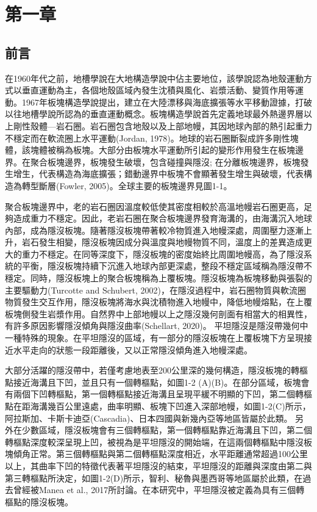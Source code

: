 
\chapter{第一章}

\section{前言}

在1960年代之前，地槽學說在大地構造學說中佔主要地位，該學說認為地殼運動方式以垂直運動為主，各個地殼區域內發生沈積與風化、岩漿活動、變質作用等運動。1967年板塊構造學說提出，建立在大陸漂移與海底擴張等水平移動證據，打破以往地槽學說所認為的垂直運動概念。板塊構造學說首先定義地球最外熱邊界層以上剛性殼體---岩石圈。岩石圈包含地殼以及上部地幔，其因地球內部的熱引起重力不穩定而在軟流圈上水平運動(Jordan, 1978)。地球的岩石圈斷裂成許多剛性塊體，該塊體被稱為板塊。大部分由板塊水平運動所引起的變形作用發生在板塊邊界。在聚合板塊邊界，板塊發生破壞，包含碰撞與隱沒; 在分離板塊邊界，板塊發生增生，代表構造為海底擴張；錯動邊界中板塊不會顯著發生增生與破壞，代表構造為轉型斷層(Fowler, 2005)。全球主要的板塊邊界見圖1-1。

聚合板塊邊界中，老的岩石圈因溫度較低使其密度相較於高溫地幔岩石圈更高，足夠造成重力不穩定。因此，老岩石圈在聚合板塊邊界發育海溝的，由海溝沉入地球內部，成為隱沒板塊。隨著隱沒板塊帶著較冷物質進入地幔深處，周圍壓力逐漸上升，岩石發生相變，隱沒板塊因成分與溫度與地幔物質不同，溫度上的差異造成更大的重力不穩定。在同等深度下，隱沒板塊的密度始終比周圍地幔高，為了隱沒系統的平衡，隱沒板塊持續下沉進入地球內部更深處，整段不穩定區域稱為隱沒帶不穩定。同時，隱沒板塊上的聚合板塊稱為上覆板塊。隱沒板塊為板塊移動與張裂的主要驅動力(Turcotte and Schubert, 2002)，在隱沒過程中，岩石圈物質與軟流圈物質發生交互作用，隱沒板塊將海水與沈積物進入地幔中，降低地幔熔點，在上覆板塊側發生岩漿作用。自然界中上部地幔以上之隱沒幾何剖面有相當大的相異性，有許多原因影響隱沒傾角與隱沒曲率(Schellart, 2020)。
平坦隱沒是隱沒帶幾何中一種特殊的現象。在平坦隱沒的區域，有一部分的隱沒板塊在上覆板塊下方呈現接近水平走向的狀態一段距離後，又以正常隱沒傾角進入地幔深處。

大部分活躍的隱沒帶中，若僅考慮地表至200公里深的幾何構造，隱沒板塊的轉樞點接近海溝且下凹，並且只有一個轉樞點，如圖1-2 (A)(B)。在部分區域，板塊會有兩個下凹轉樞點，第一個轉樞點接近海溝且呈現平緩不明顯的下凹，第二個轉樞點在距海溝幾百公里遠處，曲率明顯、板塊下凹進入深部地幔，如圖1-2(C)所示，阿拉斯加、卡斯卡迪亞(Cascadia)、日本四國與新幾內亞等地區皆屬於此類。
另外在少數區域，隱沒板塊會有三個轉樞點，第一個轉樞點靠近海溝且下凹，第二個轉樞點深度較深呈現上凹，被視為是平坦隱沒的開始端，在這兩個轉樞點中隱沒板塊傾角正常。第三個轉樞點與第二個轉樞點深度相近，水平距離通常超過100公里以上，其曲率下凹的特徵代表著平坦隱沒的結束，平坦隱沒的距離與深度由第二與第三轉樞點所決定，如圖1-2(D)所示，智利、秘魯與墨西哥等地區屬於此類，在過去曾經被Manea et al., 2017所討論。在本研究中，平坦隱沒被定義為具有三個轉樞點的隱沒板塊。

